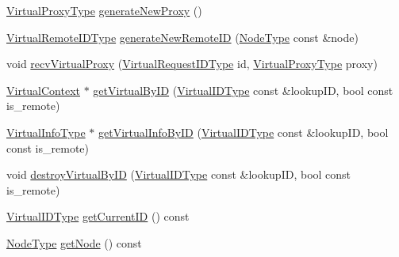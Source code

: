 \begin{DoxyCompactItemize}
\hyperlink{namespacevt_a1b417dd5d684f045bb58a0ede70045ac}{Virtual\+Proxy\+Type} \hyperlink{structvt_1_1vrt_1_1_virtual_context_manager_a9afc60815d2b382215f458e0aae9dc3f}{generate\+New\+Proxy} ()
\item 
\hyperlink{namespacevt_1_1vrt_a8184ab8c530ce523edcdc4f4c38565be}{Virtual\+Remote\+I\+D\+Type} \hyperlink{structvt_1_1vrt_1_1_virtual_context_manager_a9d5b94f32defc2e563ebf8ad54bb3164}{generate\+New\+Remote\+ID} (\hyperlink{namespacevt_a866da9d0efc19c0a1ce79e9e492f47e2}{Node\+Type} const \&node)
\item 
void \hyperlink{structvt_1_1vrt_1_1_virtual_context_manager_ab79342508fe36427b54e3d94297e223a}{recv\+Virtual\+Proxy} (\hyperlink{namespacevt_1_1vrt_ac7ef8820ebfc383fa16f09bf46eaa2b8}{Virtual\+Request\+I\+D\+Type} id, \hyperlink{namespacevt_a1b417dd5d684f045bb58a0ede70045ac}{Virtual\+Proxy\+Type} proxy)
\item 
\hyperlink{structvt_1_1vrt_1_1_virtual_context}{Virtual\+Context} $\ast$ \hyperlink{structvt_1_1vrt_1_1_virtual_context_manager_a7e586415b9dd42012cc71134d2b5fd30}{get\+Virtual\+By\+ID} (\hyperlink{namespacevt_1_1vrt_a84d0891f52f70728c3fc2172cffb464b}{Virtual\+I\+D\+Type} const \&lookup\+ID, bool const is\+\_\+remote)
\item 
\hyperlink{structvt_1_1vrt_1_1_virtual_context_manager_ad2cd828dbd8886166b4ceb3776c49239}{Virtual\+Info\+Type} $\ast$ \hyperlink{structvt_1_1vrt_1_1_virtual_context_manager_aa05f4cec5679a32e0af06fc8283996e1}{get\+Virtual\+Info\+By\+ID} (\hyperlink{namespacevt_1_1vrt_a84d0891f52f70728c3fc2172cffb464b}{Virtual\+I\+D\+Type} const \&lookup\+ID, bool const is\+\_\+remote)
\item 
void \hyperlink{structvt_1_1vrt_1_1_virtual_context_manager_a00ec944a1360a3f4a13ecfe965c22b36}{destroy\+Virtual\+By\+ID} (\hyperlink{namespacevt_1_1vrt_a84d0891f52f70728c3fc2172cffb464b}{Virtual\+I\+D\+Type} const \&lookup\+ID, bool const is\+\_\+remote)
\item 
\hyperlink{namespacevt_1_1vrt_a84d0891f52f70728c3fc2172cffb464b}{Virtual\+I\+D\+Type} \hyperlink{structvt_1_1vrt_1_1_virtual_context_manager_ad5d3f15d0882e273bf55a48610667881}{get\+Current\+ID} () const
\item 
\hyperlink{namespacevt_a866da9d0efc19c0a1ce79e9e492f47e2}{Node\+Type} \hyperlink{structvt_1_1vrt_1_1_virtual_context_manager_ac51ab2c1e35782eeace3c1aaf297214e}{get\+Node} () const
\end{DoxyCompactItemize}
